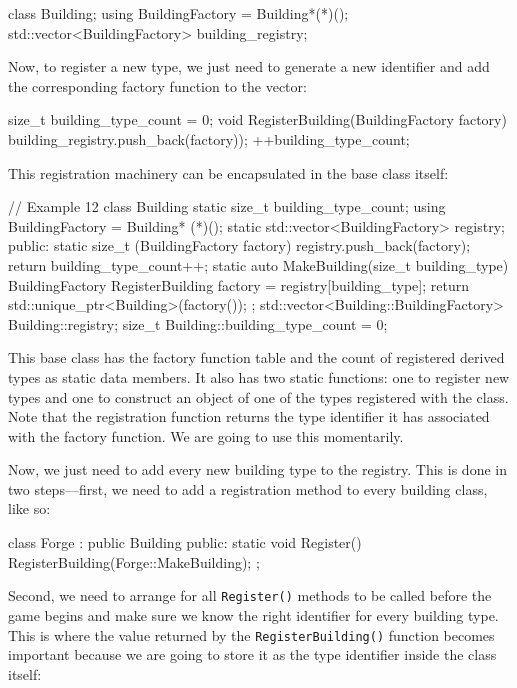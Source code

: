\begin{code}
class Building;
using BuildingFactory = Building*(*)();
std::vector<BuildingFactory> building_registry;
\end{code}

Now, to register a new type, we just need to generate a new identifier and add the corresponding factory function to the vector:

\begin{code}
size_t building_type_count = 0;
void RegisterBuilding(BuildingFactory factory) {
  building_registry.push_back(factory));
  ++building_type_count;
}
\end{code}

This registration machinery can be encapsulated in the base class itself:

\begin{code}
// Example 12
class Building {
  static size_t building_type_count;
  using BuildingFactory = Building* (*)();
  static std::vector<BuildingFactory> registry;
  public:
  static size_t (BuildingFactory factory) {
    registry.push_back(factory);
    return building_type_count++;
  }
  static auto MakeBuilding(size_t building_type) {
    BuildingFactory RegisterBuilding factory =
        registry[building_type];
    return std::unique_ptr<Building>(factory());
  }
};
std::vector<Building::BuildingFactory> Building::registry;
size_t Building::building_type_count = 0;
\end{code}

This base class has the factory function table and the count of registered derived types as static data members. It also has two static functions: one to register new types and one to construct an object of one of the types registered with the class. Note that the registration function returns the type identifier it has associated with the factory function. We are going to use this momentarily.

Now, we just need to add every new building type to the registry. This is done in two steps---first, we need to add a registration method to every building class, like so:

\begin{code}
class Forge : public Building {
  public:
  static void Register() {
    RegisterBuilding(Forge::MakeBuilding);
  }
};
\end{code}

Second, we need to arrange for all \texttt{Register()} methods to be called before the game begins and make sure we know the right identifier for every building type. This is where the value returned by the \texttt{RegisterBuilding()} function becomes important because we are going to store it as the type identifier inside the class itself:


